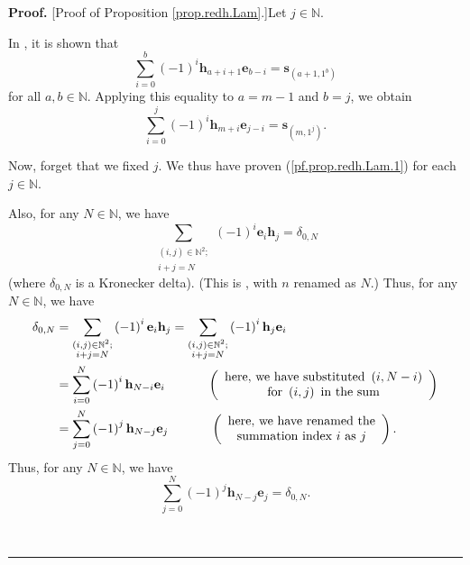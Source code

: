 \documentclass[numbers=enddot,12pt,final,onecolumn,notitlepage]{scrartcl}%
\theoremstyle{definition}
\newenvironment{proof}[1][Proof]{\noindent\textbf{#1.} }{\ \rule{0.5em}{0.5em}}
\let\sumnonlimits\sum
\renewcommand{\sum}{\sumnonlimits\limits}
\begin{document}
\begin{proof}
[Proof of Proposition \ref{prop.redh.Lam}.]Let $j\in\mathbb{N}$.

In \cite[Exercise 2.9.14(b)]{GriRei18}, it is shown that%
\begin{equation}
\sum_{i=0}^{b}\left(  -1\right)  ^{i}\mathbf{h}_{a+i+1}\mathbf{e}%
_{b-i}=\mathbf{s}_{\left(  a+1,1^{b}\right)  } \label{pf.prop.redh.Lam.ab}%
\end{equation}
for all $a,b\in\mathbb{N}$. Applying this equality to $a=m-1$ and $b=j$, we
obtain%
\begin{equation}
\sum_{i=0}^{j}\left(  -1\right)  ^{i}\mathbf{h}_{m+i}\mathbf{e}_{j-i}%
=\mathbf{s}_{\left(  m,1^{j}\right)  }. \label{pf.prop.redh.Lam.1}%
\end{equation}


Now, forget that we fixed $j$. We thus have proven (\ref{pf.prop.redh.Lam.1})
for each $j\in\mathbb{N}$.

Also, for any $N\in\mathbb{N}$, we have%
\[
\sum_{\substack{\left(  i,j\right)  \in\mathbb{N}^{2};\\i+j=N}}\left(
-1\right)  ^{i}\mathbf{e}_{i}\mathbf{h}_{j}=\delta_{0,N}%
\]
(where $\delta_{0,N}$ is a Kronecker delta). (This is \cite[(2.4.4)]%
{GriRei18}, with $n$ renamed as $N$.) Thus, for any $N\in\mathbb{N}$, we have%
\begin{align*}
\delta_{0,N}  &  =\sum_{\substack{\left(  i,j\right)  \in\mathbb{N}%
^{2};\\i+j=N}}\left(  -1\right)  ^{i}\mathbf{e}_{i}\mathbf{h}_{j}%
=\sum_{\substack{\left(  i,j\right)  \in\mathbb{N}^{2};\\i+j=N}}\left(
-1\right)  ^{i}\mathbf{h}_{j}\mathbf{e}_{i}\\
&  =\sum_{i=0}^{N}\left(  -1\right)  ^{i}\mathbf{h}_{N-i}\mathbf{e}%
_{i}\ \ \ \ \ \ \ \ \ \ \left(
\begin{array}
[c]{c}%
\text{here, we have substituted }\left(  i,N-i\right) \\
\text{for }\left(  i,j\right)  \text{ in the sum}%
\end{array}
\right) \\
&  =\sum_{j=0}^{N}\left(  -1\right)  ^{j}\mathbf{h}_{N-j}\mathbf{e}%
_{j}\ \ \ \ \ \ \ \ \ \ \left(
\begin{array}
[c]{c}%
\text{here, we have renamed the}\\
\text{summation index }i\text{ as }j
\end{array}
\right)  .
\end{align*}
Thus, for any $N\in\mathbb{N}$, we have%
\begin{equation}
\sum_{j=0}^{N}\left(  -1\right)  ^{j}\mathbf{h}_{N-j}\mathbf{e}_{j}%
=\delta_{0,N}. \label{pf.prop.redh.Lam.3}%
\end{equation}



\end{proof}
\end{document}
